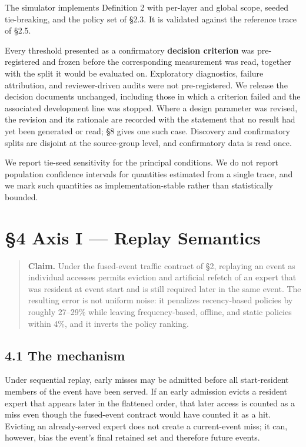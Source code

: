 \documentclass[
  10pt,
  letterpaper,
  10pt]{article}
\begin{document}
The simulator implements Definition 2 with per-layer and global scope,
seeded tie-breaking, and the policy set of §2.3. It is validated against
the reference trace of §2.5.

Every threshold presented as a confirmatory \textbf{decision criterion}
was pre-registered and frozen before the corresponding measurement was
read, together with the split it would be evaluated on. Exploratory
diagnostics, failure attribution, and reviewer-driven audits were not
pre-registered. We release the decision documents unchanged, including
those in which a criterion failed and the associated development line
was stopped. Where a design parameter was revised, the revision and its
rationale are recorded with the statement that no result had yet been
generated or read; §8 gives one such case. Discovery and confirmatory
splits are disjoint at the source-group level, and confirmatory data is
read once.

We report tie-seed sensitivity for the principal conditions. We do not
report population confidence intervals for quantities estimated from a
single trace, and we mark such quantities as implementation-stable
rather than statistically bounded.

\section{§4 Axis I --- Replay Semantics}\label{axis-i-replay-semantics}

\begin{quote}
\textbf{Claim.} Under the fused-event traffic contract of §2, replaying
an event as individual accesses permits eviction and artificial refetch
of an expert that was resident at event start and is still required
later in the same event. The resulting error is not uniform noise: it
penalizes recency-based policies by roughly 27--29\% while leaving
frequency-based, offline, and static policies within 4\%, and it inverts
the policy ranking.
\end{quote}

\subsection{4.1 The mechanism}\label{the-mechanism}

Under sequential replay, early misses may be admitted before all
start-resident members of the event have been served. If an early
admission evicts a resident expert that appears later in the flattened
order, that later access is counted as a miss even though the
fused-event contract would have counted it as a hit. Evicting an
already-served expert does not create a current-event miss; it can,
however, bias the event's final retained set and therefore future
events.
\end{document}
